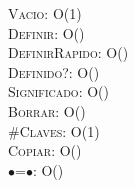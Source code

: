 \documentclass[10pt, a4paper]{article}
\let\NombreFuncion=\textsc
\newcommand{\tab}{\hspace*{7mm}}
\begin{document}
  \NombreFuncion{Vacio}: \tab O(1)
\\
  \NombreFuncion{Definir}: \tab O()
\\
  \NombreFuncion{DefinirRapido}: \tab O()
\\
  \NombreFuncion{Definido?}: \tab O()
\\
  \NombreFuncion{Significado}: \tab O()
\\
  \NombreFuncion{Borrar}: \tab O()
\\
  \NombreFuncion{$\#$Claves}: \tab O(1)
\\
  \NombreFuncion{Copiar}: \tab O()
\\
  \NombreFuncion{$\bullet$=$\bullet$}: \tab O()
\\
\end{document}
